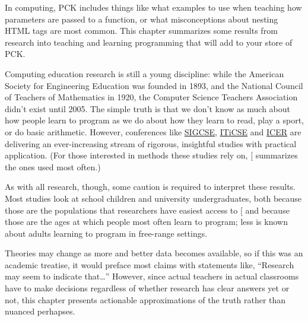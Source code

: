 In computing, PCK includes things like what examples to use when
teaching how parameters are passed to a function, or what misconceptions
about nesting HTML tags are most common. This chapter summarizes some
results from research into teaching and learning programming that will
add to your store of PCK.

Computing education research is still a young discipline: while the
American Society for Engineering Education was founded in 1893, and
the National Council of Teachers of Mathematics in 1920, the Computer
Science Teachers Association didn't exist until 2005. The simple truth
is that we don't know as much about how people learn to program as we
do about how they learn to read, play a sport, or do basic arithmetic.
However, conferences like \href{http://sigcse.org/}{SIGCSE}, \href{http://iticse.acm.org/}{ITiCSE} and
\href{https://icer.hosting.acm.org}{ICER} are delivering an ever-increasing stream of rigorous,
insightful studies with practical application. (For those interested
in methods these studies rely on, {[}\protect[\hyperlink{b:Ihan2016}{Ihan2016}]{]} summarizes the
ones used most often.)

As with all research, though, some caution is required to interpret
these results. Most studies look at school children and university
undergraduates, both because those are the populations that researchers
have easiest access to {[}\protect[\hyperlink{b:Henr2010}{Henr2010}]{]} and because those are the ages
at which people most often learn to program; less is known about adults
learning to program in free-range settings.

Theories may change as more and better data becomes available, so if
this was an academic treatise, it would preface most claims with
statements like, ``Research may seem to indicate that\ldots{}''
However, since actual teachers in actual classrooms have to make
decisions regardless of whether research has clear answers yet or not,
this chapter presents actionable approximations of the truth rather than
nuanced perhapses.


